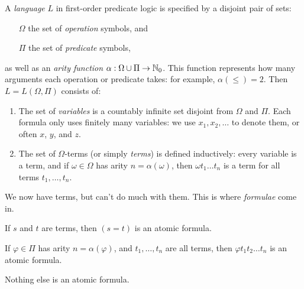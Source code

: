 \documentclass{article}
\begin{document}
\begin{definition}[Language]
    A \textit{language} $L$ in first-order predicate logic is specified by a disjoint pair of sets:
    \begin{enumerate}
    	\item[$\Omega$] the set of \textit{operation} symbols, and
    	\item[$\Pi$] the set of \textit{predicate} symbols,
	\end{enumerate}
	as well as an \textit{arity function} $\alpha : \Omega \cup \Pi \to \mathbb{N}_0$. This function represents how many arguments each operation or predicate takes: for example, $\alpha(\leq) = 2$. Then $L = L(\Omega, \Pi)$ consists of:	\begin{enumerate}
    	\item The set of \textit{variables} is a countably infinite set disjoint from $\Omega$ and $\Pi$. Each formula only uses finitely many variables: we use $x_1, x_2, \dots$ to denote them, or often $x$, $y$, and $z$.
    	\item The set of $\Omega$-terms (or simply \textit{terms}) is defined inductively: every variable is a term, and if $\omega \in \Omega$ has arity $n = \alpha(\omega)$, then $\omega t_1 \dots t_n$ is a term for all terms $t_1, \dots, t_n$.
	\end{enumerate}
\end{definition}

We now have terms, but can't do much with them. This is where \textit{formulae} come in.

\begin{definition}
    If $s$ and $t$ are terms, then $(s = t)$ is an atomic formula.
    
    If $\varphi \in \Pi$ has arity $n = \alpha(\varphi)$, and $t_1, \dots, t_n$ are all terms, then $\varphi t_1 t_2 \dots t_n$ is an atomic formula.
    
    Nothing else is an atomic formula.
\end{definition}
\end{document}
